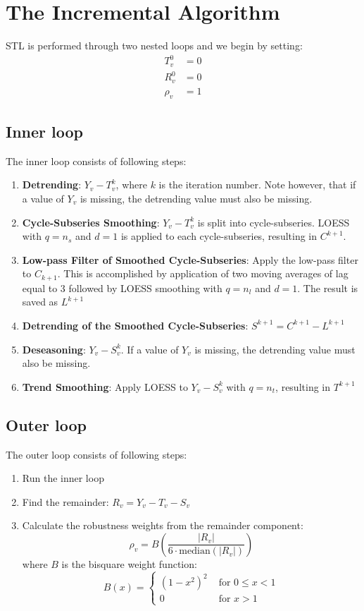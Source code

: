 \documentclass[main.tex]{subfiles}
\begin{document}
\section{The Incremental Algorithm}
\label{sec:the_incremental_algorithm}
STL is performed through two nested loops and we begin by setting:
\begin{align*}
  T_v^{0} &= 0\\
  R_v^{0} &= 0\\
  \rho_v &= 1
\end{align*}
\subsection{Inner loop}
\label{subsec:inner_loop}
The inner loop consists of following steps:
\begin{enumerate}
\item \textbf{Detrending}:
  $Y_v - T_v^k$, where $k$ is the iteration number. Note however,
  that if a value of $Y_v$ is missing, the detrending value must also be missing.
\item \textbf{Cycle-Subseries Smoothing}:
  $Y_v - T_v^k$ is split into cycle-subseries. LOESS with $q=n_s$ and $d=1$ is
  applied to each cycle-subseries, resulting in $C^{k+1}$.
\item \textbf{Low-pass Filter of Smoothed Cycle-Subseries}:
  Apply the low-pass filter to $C_{k+1}$. This is accomplished by application of two
  moving averages of lag equal to 3 followed by LOESS smoothing with $q=n_l$
  and $d=1$.
  The result is saved as $L^{k+1}$
\item \textbf{Detrending of the Smoothed Cycle-Subseries}:
  $S^{k+1} = C^{k+1} - L^{k+1}$
\item \textbf{Deseasoning}:
  $Y_v - S_v^k$. If a value of $Y_v$ is missing, the detrending value must also be missing.
\item \textbf{Trend Smoothing}:
  Apply LOESS to $Y_v - S_v^k$ with $q = n_t$, resulting in $T^{k+1}$
\end{enumerate}

\subsection{Outer loop}
\label{subsec:outer_loop}
The outer loop consists of following steps:
\begin{enumerate}
\item Run the inner loop
\item Find the remainder:
  $R_v = Y_v - T_v - S_v$
\item Calculate the robustness weights from the remainder component:
  \[
  \rho_{v}= B\left( \frac{|R_v|}{6\cdot\text{median}(|R_v|)} \right)
  \]
  where $B$ is the bisquare weight function:
  \[
  B(x) =
  \begin{cases}
    \left(1-x^{2}\right)^{2} & \text{ for } 0 \leqslant x<1 \\
     0                     & \text{ for } x>1
  \end{cases}
\]
\end{enumerate}
\end{document}
